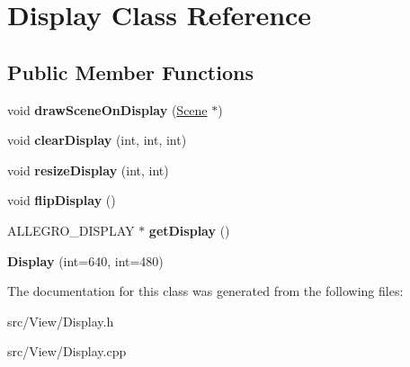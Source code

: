 \hypertarget{classDisplay}{}\section{Display Class Reference}
\label{classDisplay}
\subsection*{Public Member Functions}
\begin{DoxyCompactItemize}
\item 
void {\bfseries draw\+Scene\+On\+Display} (\hyperlink{classScene}{Scene} $\ast$)\hypertarget{classDisplay_ad735068ee75f69ff87373dc80607a6de}{}\label{classDisplay_ad735068ee75f69ff87373dc80607a6de}

\item 
void {\bfseries clear\+Display} (int, int, int)\hypertarget{classDisplay_af4cf5b66237916d8c4b1baf135037202}{}\label{classDisplay_af4cf5b66237916d8c4b1baf135037202}

\item 
void {\bfseries resize\+Display} (int, int)\hypertarget{classDisplay_a6de73ad4135258995b2deee44e1e628a}{}\label{classDisplay_a6de73ad4135258995b2deee44e1e628a}

\item 
void {\bfseries flip\+Display} ()\hypertarget{classDisplay_a9b945675bac2549db7a392c9ef242ee5}{}\label{classDisplay_a9b945675bac2549db7a392c9ef242ee5}

\item 
A\+L\+L\+E\+G\+R\+O\+\_\+\+D\+I\+S\+P\+L\+AY $\ast$ {\bfseries get\+Display} ()\hypertarget{classDisplay_a6ea827abdef4bc9496d565296c9da61e}{}\label{classDisplay_a6ea827abdef4bc9496d565296c9da61e}

\item 
{\bfseries Display} (int=640, int=480)\hypertarget{classDisplay_ac962d82df123871e4bdc6cae9c9613e7}{}\label{classDisplay_ac962d82df123871e4bdc6cae9c9613e7}

\end{DoxyCompactItemize}


The documentation for this class was generated from the following files\+:\begin{DoxyCompactItemize}
\item 
src/\+View/Display.\+h\item 
src/\+View/Display.\+cpp\end{DoxyCompactItemize}
